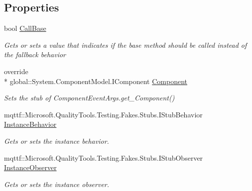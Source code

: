 \subsection*{Properties}
\begin{DoxyCompactItemize}
\item 
bool \hyperlink{class_system_1_1_component_model_1_1_design_1_1_fakes_1_1_stub_component_event_args_a615ddea49879ca24da8958ee125590ab}{Call\-Base}
\begin{DoxyCompactList}\small\item\em Gets or sets a value that indicates if the base method should be called instead of the fallback behavior\end{DoxyCompactList}\item 
override \\*
global\-::\-System.\-Component\-Model.\-I\-Component \hyperlink{class_system_1_1_component_model_1_1_design_1_1_fakes_1_1_stub_component_event_args_af02afecd774ef5e649ec1d88c1852ad6}{Component}
\begin{DoxyCompactList}\small\item\em Sets the stub of Component\-Event\-Args.\-get\-\_\-\-Component()\end{DoxyCompactList}\item 
mqttf\-::\-Microsoft.\-Quality\-Tools.\-Testing.\-Fakes.\-Stubs.\-I\-Stub\-Behavior \hyperlink{class_system_1_1_component_model_1_1_design_1_1_fakes_1_1_stub_component_event_args_ac3e94e9232c9aa52f6fafe3b231131fb}{Instance\-Behavior}
\begin{DoxyCompactList}\small\item\em Gets or sets the instance behavior.\end{DoxyCompactList}\item 
mqttf\-::\-Microsoft.\-Quality\-Tools.\-Testing.\-Fakes.\-Stubs.\-I\-Stub\-Observer \hyperlink{class_system_1_1_component_model_1_1_design_1_1_fakes_1_1_stub_component_event_args_acb43080a9f96be12767279a4009e7187}{Instance\-Observer}
\begin{DoxyCompactList}\small\item\em Gets or sets the instance observer.\end{DoxyCompactList}\end{DoxyCompactItemize}


